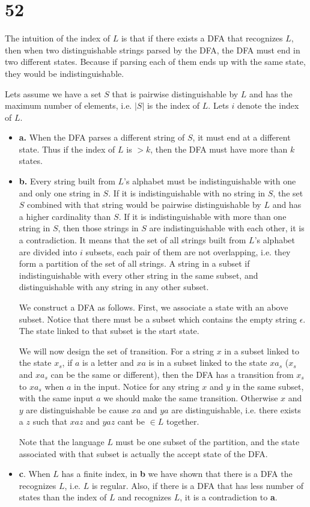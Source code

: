 \documentclass[12pt]{book}
\begin{document}
\section{52}
The intuition of the index of $L$ is that if there exists a DFA that recognizes $L$, then when two distinguishable strings parsed by the DFA, the DFA must end in two different states. Because if parsing each of them ends up with the same state, they would be indistinguishable.

Lets assume we have a set $S$ that is pairwise distinguishable by $L$ and has the maximum number of elements, i.e. $|S|$ is the index of $L$. Lets  $i$ denote the index of $L$.
\begin{itemize}
	\item \textbf{a.} When the DFA parses a different string of $S$, it must end at a different state. Thus if the index of $L$ is $> k$, then the DFA must have more than $k$ states.
	\item \textbf{b.} Every string built from $L$'s alphabet must be indistinguishable with one and only one string in $S$. If it is indistinguishable with no string in $S$, the set $S$ combined with that string would be pairwise distinguishable by $L$ and has a higher cardinality than $S$. If it is indistinguishable with more than one string in $S$, then those strings in $S$ are indistinguishable with each other, it is a contradiction. It means that the set of all strings built from $L$'s alphabet are divided into $i$ subsets, each pair of them are not overlapping, i.e. they form a partition of the set of all strings. A string in a subset if indistinguishable with every other string in the same subset, and distinguishable with any string in any other subset.
	
	We construct a DFA as follows. First, we associate a state with an above subset. Notice that there must be a subset which contains the empty string $\epsilon$. The state linked to that subset is the start state.
	
	We will now design the set of transition. For a string $x$ in a subset linked to the state $x_s$, if $a$ is a letter and $xa$ is in a subset linked to the state $xa_s$ ($x_s$ and $xa_s$ can be the same or different), then the DFA has a transition from $x_s$ to $xa_s$ when $a$ in the input. Notice for any string $x$ and $y$ in the same subset, with the same input $a$ we should make the same transition. Otherwise $x$ and $y$ are distinguishable be cause $xa$ and $ya$ are distinguishable, i.e. there exists a $z$ such that $xaz$ and $yaz$ cant be $\in L$ together.
	
	Note that the language $L$ must be one subset of the partition, and the state associated with that subset is actually the accept state of the DFA.
	\item \textbf{c}. When $L$ has a finite index, in \textbf{b} we have shown that there is a DFA the recognizes $L$, i.e. $L$ is regular. Also, if there is a DFA that has less number of states than the index of $L$ and recognizes $L$, it is a contradiction to \textbf{a}.
	
\end{itemize}
\end{document}
